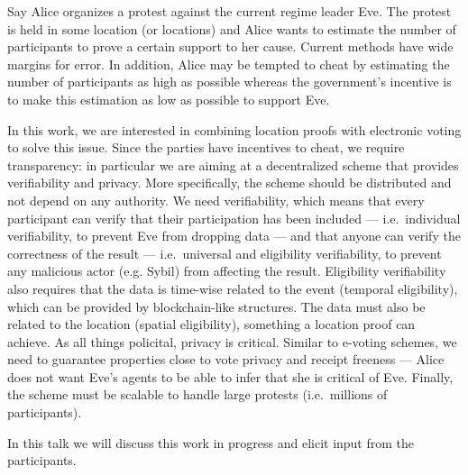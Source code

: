 Say Alice organizes a protest against the current regime leader Eve.
The protest is held in some location (or locations) and Alice wants to estimate 
the number of participants to prove a certain support to her cause.
Current methods have wide margins for error.
In addition, Alice may be tempted to cheat by estimating the number of 
participants as high as possible whereas the government's incentive is to make 
this estimation as low as possible to support Eve.
                                                                                  
In this work, we are interested in combining location proofs with electronic 
voting to solve this issue.
Since the parties have incentives to cheat, we require transparency: in 
particular we are aiming at a decentralized scheme that provides verifiability 
and privacy.
More specifically, the scheme should be distributed and not depend on any 
authority.
We need verifiability, which means that every participant can verify that their 
participation has been included --- i.e.\ individual verifiability, to prevent 
Eve from dropping data --- and that anyone can verify the correctness of the 
result --- i.e.\ universal and eligibility verifiability, to prevent any 
malicious actor (e.g. Sybil) from affecting the result.
Eligibility verifiability also requires that the data is time-wise related to 
the event (temporal eligibility), which can be provided by blockchain-like 
structures.
The data must also be related to the location (spatial eligibility), something 
a location proof can achieve.
As all things policital, privacy is critical.
Similar to e-voting schemes, we need to guarantee properties close to vote 
privacy and receipt freeness --- Alice does not want Eve's agents to be able to 
infer that she is critical of Eve.
Finally, the scheme must be scalable to handle large protests (i.e.\ millions 
of participants).

In this talk we will discuss this work in progress and elicit input from the
participants.


